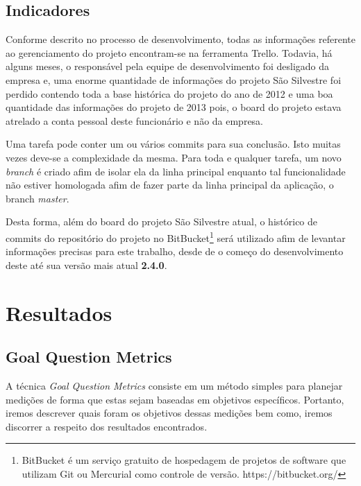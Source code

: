 \documentclass[11pt, a4paper]{article}
\begin{document}
\subsection{Indicadores}
Conforme descrito no processo de desenvolvimento, todas as informações referente ao gerenciamento do projeto encontram-se na ferramenta Trello. Todavia, há alguns meses, o responsável pela equipe de desenvolvimento foi desligado da empresa e, uma enorme quantidade de informações do projeto São Silvestre foi perdido contendo toda a base histórica do projeto do ano de 2012 e uma boa quantidade das informações do projeto de 2013 pois, o board do projeto estava atrelado a conta pessoal deste funcionário e não da empresa. 

Uma tarefa pode conter um ou vários commits para sua conclusão. Isto muitas vezes deve-se a complexidade da mesma. Para toda e qualquer tarefa, um novo \textit{branch} é criado afim de isolar ela da linha principal enquanto tal funcionalidade não estiver homologada afim de fazer parte da linha principal da aplicação, o branch \textit{master}.

Desta forma, além do board do projeto São Silvestre atual, o histórico de commits do repositório do projeto no BitBucket\footnote{BitBucket é um serviço gratuito de hospedagem de projetos de software que utilizam Git ou Mercurial como controle de versão. https://bitbucket.org/} será utilizado afim de levantar informações precisas para este trabalho, desde de o começo do desenvolvimento deste até sua versão mais atual \textbf{2.4.0}.

\section{Resultados}\label{sec:resultados}
\subsection{Goal Question Metrics}
A técnica \textit{Goal Question Metrics} consiste em um método simples para planejar medições de forma que estas sejam baseadas em objetivos específicos. Portanto, iremos descrever quais foram os objetivos dessas medições bem como, iremos discorrer a respeito dos resultados encontrados.\cite[p.444]{sommerville}
\end{document}
